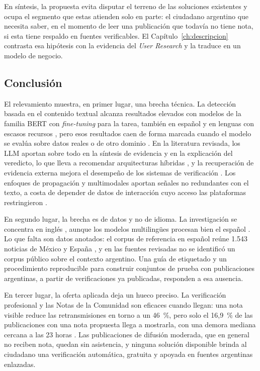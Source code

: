 En síntesis, la propuesta evita disputar el terreno de las soluciones existentes y ocupa el segmento que estas atienden solo en parte: el ciudadano argentino que necesita saber, en el momento de leer una publicación que todavía no tiene nota, si esta tiene respaldo en fuentes verificables. El Capítulo~\ref{ch:descripcion} contrasta esa hipótesis con la evidencia del \textit{User Research} y la traduce en un modelo de negocio.

\subsection{Conclusión}
\label{sec:eda-conclusion}

El relevamiento muestra, en primer lugar, una brecha técnica. La detección basada en el contenido textual alcanza resultados elevados con modelos de la familia BERT con \textit{fine-tuning} para la tarea, también en español y en lenguas con escasos recursos \parencite{KaliyarEtAl2021,ToapantaEtAl2024,AlbtoushEtAl2025}, pero esos resultados caen de forma marcada cuando el modelo se evalúa sobre datos reales o de otro dominio \parencite{BlancoFernandezEtAl2024,HasanEtAl2025}. En la literatura revisada, los LLM aportan sobre todo en la síntesis de evidencia y en la explicación del veredicto, lo que lleva a recomendar arquitecturas híbridas \parencite{RazaEtAl2024,SrbaEtAl2025}, y la recuperación de evidencia externa mejora el desempeño de los sistemas de verificación \parencite{TianEtAl2024}. Los enfoques de propagación y multimodales aportan señales no redundantes con el texto, a costa de depender de datos de interacción cuyo acceso las plataformas restringieron \parencite{BianEtAl2020,NakamuraEtAl2020}.

En segundo lugar, la brecha es de datos y no de idioma. La investigación se concentra en inglés \parencite{WangEtAl2024survey,DrzchalEtAl2024}, aunque los modelos multilingües procesan bien el español \parencite{GoulievEtAl2025}. Lo que falta son datos anotados: el corpus de referencia en español reúne 1.543 noticias de México y España \parencite{PosadasEtAl2019,GomezAdornoEtAl2021}, y en las fuentes revisadas no se identificó un corpus público sobre el contexto argentino. Una guía de etiquetado y un procedimiento reproducible para construir conjuntos de prueba con publicaciones argentinas, a partir de verificaciones ya publicadas, responden a esa ausencia.

En tercer lugar, la oferta aplicada deja un hueco preciso. La verificación profesional y las Notas de la Comunidad son eficaces cuando llegan: una nota visible reduce las retransmisiones en torno a un 46~\%, pero solo el 16,9~\% de las publicaciones con una nota propuesta llega a mostrarla, con una demora mediana cercana a las 23 horas \parencite{SlaughterEtAl2025}. Las publicaciones de difusión moderada, que en general no reciben nota, quedan sin asistencia, y ninguna solución disponible brinda al ciudadano una verificación automática, gratuita y apoyada en fuentes argentinas enlazadas.

